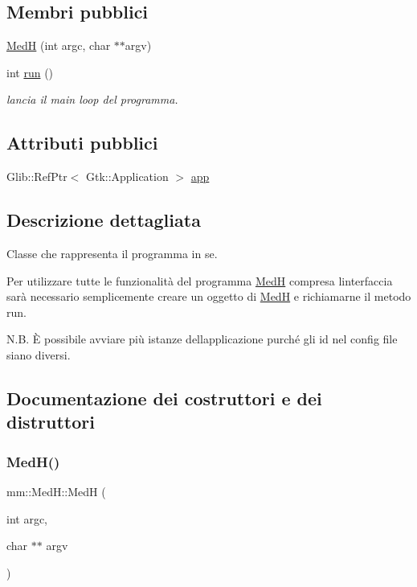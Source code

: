 \subsection*{Membri pubblici}
\begin{DoxyCompactItemize}
\item 
\hyperlink{classmm_1_1_med_h_a60861cff31fe5bc04e0002c6dabd5a9b}{MedH} (int argc, char $\ast$$\ast$argv)
\item 
int \hyperlink{classmm_1_1_med_h_aa34d2244a28a72dac6028e70317eb40b}{run} ()
\begin{DoxyCompactList}\small\item\em lancia il main loop del programma. \end{DoxyCompactList}\end{DoxyCompactItemize}
\subsection*{Attributi pubblici}
\begin{DoxyCompactItemize}
\item 
Glib\+::\+Ref\+Ptr$<$ Gtk\+::\+Application $>$ \hyperlink{classmm_1_1_med_h_a6bbf4476e1953d62562d35cb1f9c4218}{app}
\end{DoxyCompactItemize}


\subsection{Descrizione dettagliata}
Classe che rappresenta il programma in se. 

Per utilizzare tutte le funzionalità del programma \hyperlink{classmm_1_1_med_h}{MedH} compresa l\textquotesingle{}interfaccia sarà necessario semplicemente creare un oggetto di \hyperlink{classmm_1_1_med_h}{MedH} e richiamarne il metodo run.

N.\+B. È possibile avviare più istanze dell\textquotesingle{}applicazione purché gli id nel config file siano diversi. 

\subsection{Documentazione dei costruttori e dei distruttori}
\mbox{\label{classmm_1_1_med_h_a60861cff31fe5bc04e0002c6dabd5a9b}} 
\subsubsection{\texorpdfstring{Med\+H()}{MedH()}}
{\footnotesize\ttfamily mm\+::\+Med\+H\+::\+MedH (\begin{DoxyParamCaption}\item[{int}]{argc,  }\item[{char $\ast$$\ast$}]{argv }\end{DoxyParamCaption})}



